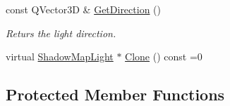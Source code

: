 \begin{DoxyCompactItemize}
const Q\+Vector3D \& \mbox{\hyperlink{class_geometry_engine_1_1_geometry_world_item_1_1_geometry_light_1_1_shadow_map_light_a5443fd7c5c2549073841c691f21ba1e4}{Get\+Direction}} ()
\begin{DoxyCompactList}\small\item\em Returs the light direction. \end{DoxyCompactList}\item 
virtual \mbox{\hyperlink{class_geometry_engine_1_1_geometry_world_item_1_1_geometry_light_1_1_shadow_map_light}{Shadow\+Map\+Light}} $\ast$ \mbox{\hyperlink{class_geometry_engine_1_1_geometry_world_item_1_1_geometry_light_1_1_shadow_map_light_a48eb6af2e6bb8487568ee4265fbc49ee}{Clone}} () const =0
\end{DoxyCompactItemize}
\subsection*{Protected Member Functions}
